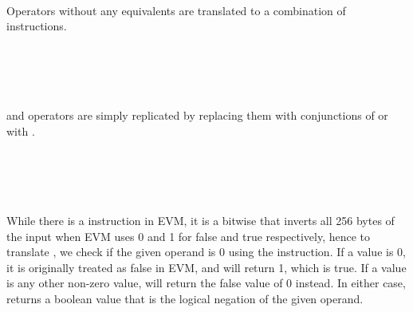 \begin{prooftree}
\end{prooftree}\qquad
\begin{prooftree}
\end{prooftree}\qquad
\begin{prooftree}
\end{prooftree}\\\\\\
Operators without any equivalents are translated to a combination of instructions. \\\\
\begin{prooftree}
\end{prooftree}\qquad
\begin{prooftree}
\end{prooftree}\\\\\\
\code{<=} and \code{>=} operators are simply replicated by replacing them with conjunctions of \code{<} or \code{>} with \code{===}. \\\\
\begin{prooftree}
\end{prooftree}\\\\\\
While there is a  instruction in EVM, it is a bitwise  that inverts all 256 bytes of the input when EVM uses 0 and 1 for false and true respectively, hence to translate \code{!}, we check if the given operand is 0 using the  instruction. If a value is 0, it is originally treated as false in EVM, and  will return 1, which is true. If a value is any other non-zero value,  will return the false value of 0 instead. In either case,  returns a boolean value that is the logical negation of the given operand. \\\\\\
